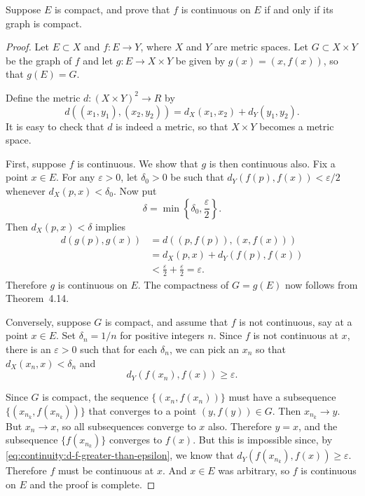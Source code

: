 Suppose $E$ is compact, and prove that $f$ is continuous on $E$ if and
only if its graph is compact.
\begin{proof}
  Let $E\subset X$ and $f\colon E\to Y$, where $X$ and $Y$ are metric
  spaces. Let $G\subset X\times Y$ be the graph of $f$ and let
  $g\colon E\to X\times Y$ be given by $g(x) = (x,f(x))$, so that
  $g(E) = G$.

  Define the metric $d\colon(X\times Y)^2\to R$ by
  \begin{equation*}
    d((x_1,y_1), (x_2,y_2)) = d_X(x_1,x_2) + d_Y(y_1,y_2).
  \end{equation*}
  It is easy to check that $d$ is indeed a metric, so that $X\times Y$
  becomes a metric space.

  First, suppose $f$ is continuous. We show that $g$ is then
  continuous also. Fix a point $x\in E$. For any $\varepsilon > 0$,
  let $\delta_0>0$ be such that $d_Y(f(p),f(x)) < \varepsilon/2$
  whenever $d_X(p,x) < \delta_0$. Now put
  \begin{equation*}
    \delta = \min\left\{\delta_0, \frac\varepsilon2\right\}.
  \end{equation*}
  Then $d_X(p,x) < \delta$ implies
  \begin{align*}
    d(g(p),g(x))
    &= d((p,f(p)), (x,f(x))) \\
    &= d_X(p,x) + d_Y(f(p),f(x)) \\
    &< \frac\varepsilon2 + \frac\varepsilon2 = \varepsilon.
  \end{align*}
  Therefore $g$ is continuous on $E$. The compactness of $G = g(E)$
  now follows from Theorem~4.14.

  Conversely, suppose $G$ is compact, and assume that $f$ is not
  continuous, say at a point $x\in E$. Set $\delta_n = 1/n$ for
  positive integers $n$. Since $f$ is not continuous at $x$, there is
  an $\varepsilon > 0$ such that for each $\delta_n$, we can pick an
  $x_n$ so that $d_X(x_n,x) < \delta_n$ and
  \begin{equation}
    \label{eq:continuity:d-f-greater-than-epsilon}
    d_Y(f(x_n),f(x))\geq\varepsilon.
  \end{equation}

  Since $G$ is compact, the sequence $\{(x_n,f(x_n))\}$ must have a
  subsequence $\{(x_{n_k},f(x_{n_k}))\}$ that converges to a point
  $(y, f(y))\in G$. Then $x_{n_k}\to y$. But $x_n\to x$, so all
  subsequences converge to $x$ also. Therefore $y = x$, and the
  subsequence $\{f(x_{n_k})\}$ converges to $f(x)$. But this is
  impossible since, by \eqref{eq:continuity:d-f-greater-than-epsilon},
  we know that $d_Y(f(x_{n_k}),f(x))\geq\varepsilon$. Therefore $f$
  must be continuous at $x$. And $x\in E$ was arbitrary, so $f$ is
  continuous on $E$ and the proof is complete.
\end{proof}

